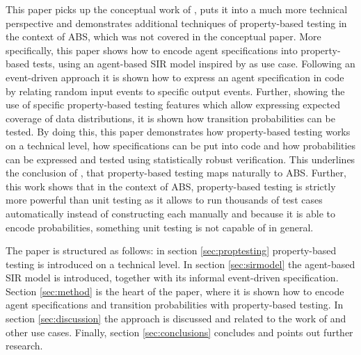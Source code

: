 This paper picks up the conceptual work of \cite{thaler_show_2019}, puts it into a much more technical perspective and demonstrates additional techniques of property-based testing in the context of ABS, which was not covered in the conceptual paper. More specifically, this paper shows how to encode agent specifications into property-based tests, using an agent-based SIR model inspired by \cite{macal_agent-based_2010} as use case. Following an event-driven approach it is shown how to express an agent specification in code by relating random input events to specific output events. Further, showing the use of specific property-based testing features which allow expressing expected coverage of data distributions, it is shown how transition probabilities can be tested. By doing this, this paper demonstrates how property-based testing works on a technical level, how specifications can be put into code and how probabilities can be expressed and tested using statistically robust verification. This underlines the conclusion of \cite{thaler_show_2019}, that property-based testing maps naturally to ABS. Further, this work shows that in the context of ABS, property-based testing is strictly more powerful than unit testing as it allows to run thousands of test cases automatically instead of constructing each manually and because it is able to encode probabilities, something unit testing is not capable of in general.

The paper is structured as follows: in section \ref{sec:proptesting} property-based testing is introduced on a technical level. In section \ref{sec:sirmodel} the agent-based SIR model is introduced, together with its informal event-driven specification. Section \ref{sec:method} is the heart of the paper, where it is shown how to encode agent specifications and transition probabilities with property-based testing. In section \ref{sec:discussion} the approach is discussed and related to the work of \cite{thaler_show_2019} and other use cases. Finally, section \ref{sec:conclusions} concludes and points out further research.